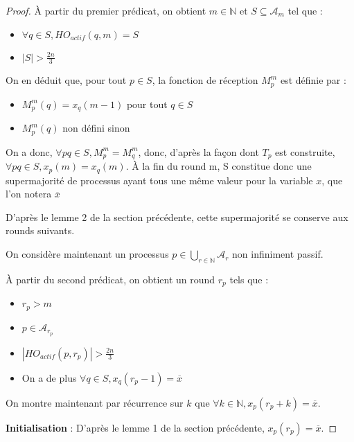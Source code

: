 \documentclass{article}
\begin{document}
\begin{proof}

	À partir du premier prédicat, on obtient $m \in \mathds{N}$ et $S \subseteq \mathcal{A}_m$ tel que :
	\begin{itemize}

		\item $\forall q \in S, HO_{actif}(q, m) = S$
		\item $|S| > \frac{2 n}{3}$

	\end{itemize}

	On en déduit que, pour tout $p \in S$, la fonction de réception $M_p^m$ est définie par :
	\begin{itemize}

		\item $M_p^m(q) = x_q(m-1)$ pour tout $q \in S$
		\item $M_p^m(q)$ non défini sinon

	\end{itemize}

	On a donc, $\forall p q \in S, M_p^m = M_q^m$, donc, d'après la façon dont $T_p$ est construite, $\forall p q \in S, x_p(m) = x_q(m)$.
	À la fin du round m, S constitue donc une supermajorité de processus ayant tous une même valeur pour la variable $x$, que l'on notera $\overline{x}$

D'après le lemme 2 de la section précédente, cette supermajorité se conserve aux rounds suivants.

	On considère maintenant un processus $p \in \bigcup\limits_{r \in \mathds{N}} \mathcal{A}_r$ non infiniment passif.

	À partir du second prédicat, on obtient un round $r_p$ tels que :
	\begin{itemize}

		\item $r_p > m$
		\item $p \in \mathcal{A}_{r_p}$
		\item $|HO_{actif}(p, r_p)| > \frac{2 n}{3}$
		\item On a de plus $\forall q \in S, x_q(r_p-1) = \overline{x}$

	\end{itemize}

	On montre maintenant par récurrence sur $k$ que $\forall k \in \mathds{N}, x_p(r_p+k) = \overline{x}$.

	\textbf{Initialisation} :
	D'après le lemme 1 de la section précédente, $x_p(r_p) = \overline{x}$.


\end{proof}
\end{document}
